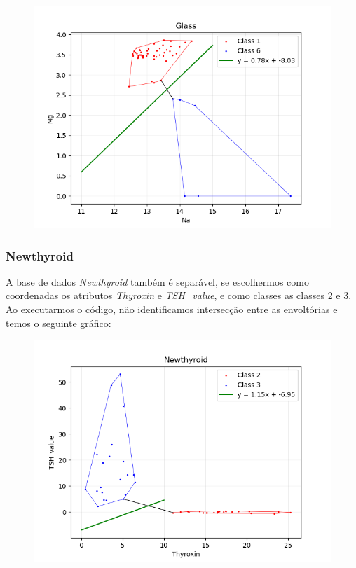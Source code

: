 \documentclass{article}
\begin{document}
\begin{figure} [H]
	\includegraphics[width=12cm]{glass.png}
	\centering
\end{figure}


\subsubsection{Newthyroid}

A base de dados \textit{Newthyroid} também é separável, se escolhermos como coordenadas os atributos \textit{Thyroxin} e \textit{TSH\_value}, e como classes as classes 2 e 3. Ao executarmos o código, não identificamos intersecção entre as envoltórias e temos o seguinte gráfico:

\begin{figure} [H]
	\includegraphics[width=12cm]{newthyroid.png}
	\centering
\end{figure}
\end{document}

